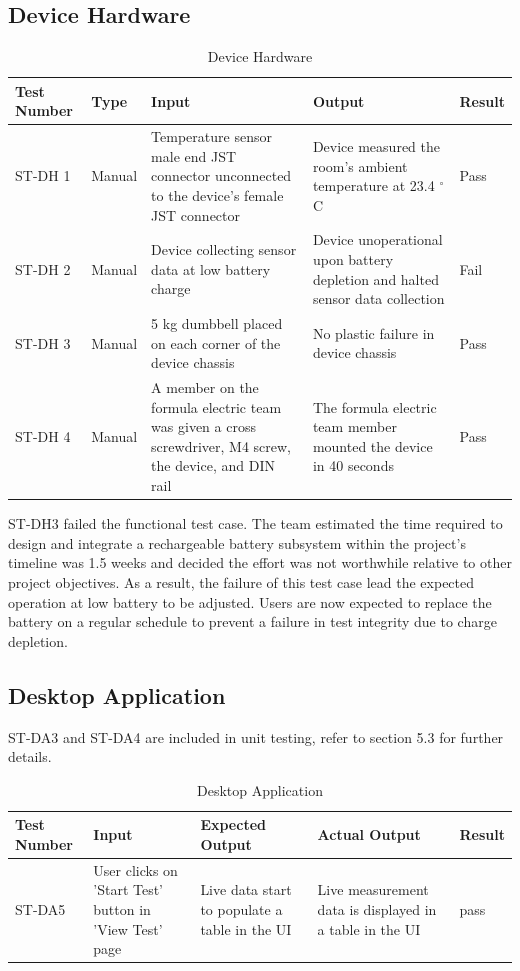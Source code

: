 \documentclass[12pt, titlepage]{article}
\begin{document}
\subsection{Device Hardware}
\begin{table}[H]
  \begin{tabular}{| p{} | p{}| p{}| p{}| p{}|}
    \hline
    \rowcolor[gray]{0.9}
    Test Number & Type & Input & Output & Result\\
    \hline
    ST-DH 1 & Manual & Temperature sensor male end JST connector unconnected to the device's female JST connector & Device measured the room's ambient temperature at 23.4 $^{\circ}$C & Pass \\
    \hline
    ST-DH 2 & Manual & Device collecting sensor data at low battery charge & Device unoperational upon battery depletion and halted sensor data collection & Fail \\
    \hline
    ST-DH 3 & Manual & 5 kg dumbbell placed on each corner of the device chassis & No plastic failure in device chassis & Pass  \\
    \hline
    ST-DH 4 & Manual & A member on the formula electric team was given a cross screwdriver, M4 screw, the device, and DIN rail & The formula electric team member mounted the device in 40 seconds & Pass  \\
    \hline
  \end{tabular}
  \caption{Device Hardware}
  \end{table} 
 

  ST-DH3 failed the functional test case. The team estimated the time required to design and integrate a rechargeable battery subsystem within the project's timeline was 1.5 weeks and decided the effort was not worthwhile relative to other project objectives. As a result, the failure of this test case lead the expected operation at low battery to be adjusted. Users are now expected to replace the battery on a regular schedule to prevent a failure in test integrity due to charge depletion. \\

\newpage
\subsection{Desktop Application}
ST-DA3 and ST-DA4 are included in unit testing, refer to section 5.3 for further details.
\begin{table}[H]
\begin{tabular}{| p{} | p{}| p{}| p{}| p{}|}
  \hline
  \rowcolor[gray]{0.9}
  Test Number & Input & Expected Output & Actual Output & Result\\
  \hline
  ST-DA5 & User clicks on 'Start Test' button in 'View Test' page & Live data start to populate a table in the UI & Live measurement data is displayed in a table in the UI & pass \\
  \hline
\end{tabular}
\caption{Desktop Application}
\end{table}
\end{document}
